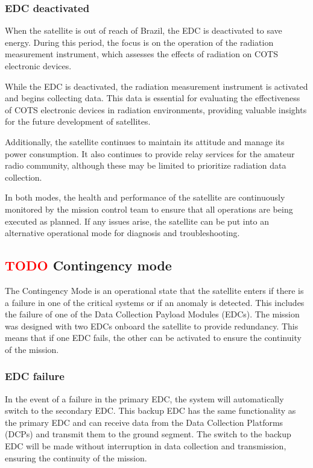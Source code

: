 \subsubsection{EDC deactivated}

When the satellite is out of reach of Brazil, the EDC is deactivated to save energy. During this period, the focus is on the operation of the radiation measurement instrument, which assesses the effects of radiation on COTS electronic devices.

While the EDC is deactivated, the radiation measurement instrument is activated and begins collecting data. This data is essential for evaluating the effectiveness of COTS electronic devices in radiation environments, providing valuable insights for the future development of satellites.

Additionally, the satellite continues to maintain its attitude and manage its power consumption. It also continues to provide relay services for the amateur radio community, although these may be limited to prioritize radiation data collection.

In both modes, the health and performance of the satellite are continuously monitored by the mission control team to ensure that all operations are being executed as planned. If any issues arise, the satellite can be put into an alternative operational mode for diagnosis and troubleshooting.

\subsection{ \textcolor{red}{TODO} Contingency mode}

The Contingency Mode is an operational state that the satellite enters if there is a failure in one of the critical systems or if an anomaly is detected. This includes the failure of one of the Data Collection Payload Modules (EDCs). The mission was designed with two EDCs onboard the satellite to provide redundancy. This means that if one EDC fails, the other can be activated to ensure the continuity of the mission.

\subsubsection{EDC failure}

In the event of a failure in the primary EDC, the system will automatically switch to the secondary EDC. This backup EDC has the same functionality as the primary EDC and can receive data from the Data Collection Platforms (DCPs) and transmit them to the ground segment. The switch to the backup EDC will be made without interruption in data collection and transmission, ensuring the continuity of the mission.

